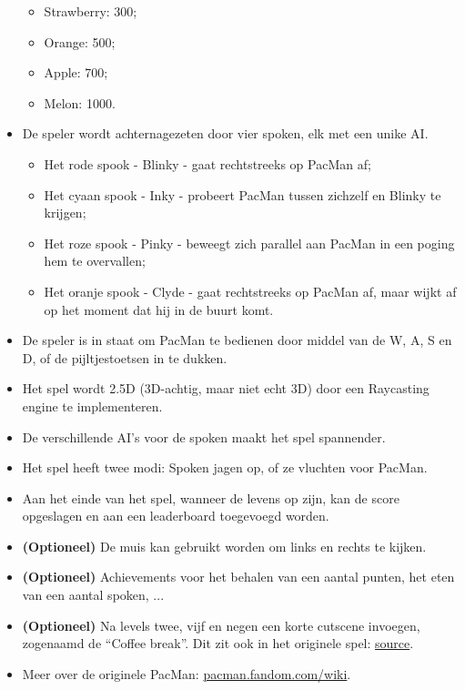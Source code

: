 \documentclass{article}
\begin{document}
\begin{itemize}[noitemsep]
\begin{itemize}[noitemsep]
        \item Strawberry: 300;
        \item Orange: 500;
        \item Apple: 700;
        \item Melon: 1000.
    \end{itemize}
    \item De speler wordt achternagezeten door vier spoken, elk met een unike AI.
    \begin{itemize}[noitemsep]
        \item Het rode spook - Blinky - gaat rechtstreeks op PacMan af;
        \item Het cyaan spook - Inky - probeert PacMan tussen zichzelf en Blinky te krijgen;
        \item Het roze spook - Pinky - beweegt zich parallel aan PacMan in een poging hem te overvallen;
        \item Het oranje spook - Clyde - gaat rechtstreeks op PacMan af, maar wijkt af op het moment dat hij in de buurt komt.
    \end{itemize}
    \item De speler is in staat om PacMan te bedienen door middel van de W, A, S en D, of de pijltjestoetsen in te dukken.
    \item Het spel wordt 2.5D (3D-achtig, maar niet echt 3D) door een Raycasting engine te implementeren.
    \item De verschillende AI's voor de spoken maakt het spel spannender.
    \item Het spel heeft twee modi: Spoken jagen op, of ze vluchten voor PacMan.
    \item Aan het einde van het spel, wanneer de levens op zijn, kan de score opgeslagen en aan een leaderboard toegevoegd worden.
    \item \textbf{(Optioneel)} De muis kan gebruikt worden om links en rechts te kijken.
    \item \textbf{(Optioneel)} Achievements voor het behalen van een aantal punten, het eten van een aantal spoken, ...
    \item \textbf{(Optioneel)} Na levels twee, vijf en negen een korte cutscene invoegen, zogenaamd de ``Coffee break''. Dit zit ook in het originele spel: \href{https://pacman.fandom.com/wiki/Coffee_Break}{source}.
    \item Meer over de originele PacMan: \href{https://pacman.fandom.com/wiki/Pac-Man_(game)}{pacman.fandom.com/wiki}.
\end{itemize}
\end{document}
